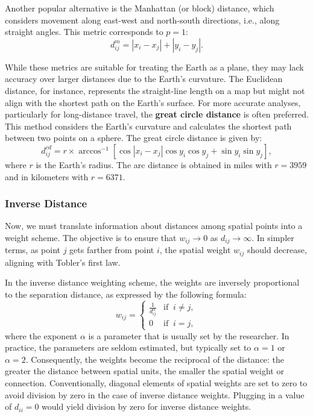 \documentclass[english,12pt]{book}\usepackage[]{graphicx}\usepackage[]{xcolor}
\begin{document}
Another popular alternative is the Manhattan (or block) distance, which considers movement along east-west and north-south directions, i.e., along straight angles. This metric corresponds to $p = 1$:
\begin{equation*}
   d_{ij}^m = \left|x_i - x_j\right| + \left|y_i - y_j\right|.
\end{equation*}

While these metrics are suitable for treating the Earth as a plane, they may lack accuracy over larger distances due to the Earth's curvature. The Euclidean distance, for instance, represents the straight-line length on a map but might not align with the shortest path on the Earth's surface. For more accurate analyses, particularly for long-distance travel, the \textbf{great circle distance} is often preferred. This method considers the Earth's curvature and calculates the shortest path between two points on a sphere. The great circle distance is given by:
\begin{equation*}
d_{ij}^{cd} = r \times \arccos^{-1}\left[\cos|x_i - x_j| \cos y_i \cos y_j + \sin y_i \sin y_j \right],
\end{equation*}
%
where $r$ is the Earth's radius. The arc distance is obtained in miles with $r = 3959$ and in kilometers with $r = 6371$.

\subsubsection{Inverse Distance}\label{sec:inverse_distance}

Now, we must translate information about distances among spatial points into a weight scheme. The objective is to ensure that $w_{ij} \to 0$ as $d_{ij} \to \infty$. In simpler terms, as point $j$ gets farther from point $i$, the spatial weight $w_{ij}$ should decrease, aligning with Tobler's first law.

In the inverse distance weighting scheme, the weights are inversely proportional to the separation distance, as expressed by the following formula:
\begin{equation*}
  w_{ij} =
  \begin{cases}
  \frac{1}{d_{ij}^{\alpha}} & \mbox{if} \;\;i \neq j, \\
  0 & \mbox{if}\;\; i = j,
  \end{cases}
\end{equation*}
%
where the exponent $\alpha$ is a parameter that is usually set by the researcher. In practice, the parameters are seldom estimated, but typically set to $\alpha = 1$ or $\alpha = 2$. Consequently, the weights become the reciprocal of the distance: the greater the distance between spatial units, the smaller the spatial weight or connection. Conventionally, diagonal elements of spatial weights are set to zero to avoid division by zero in the case of inverse distance weights. Plugging in a value of $d_{ii} = 0$ would yield division by zero for inverse distance weights. 
\end{document}
